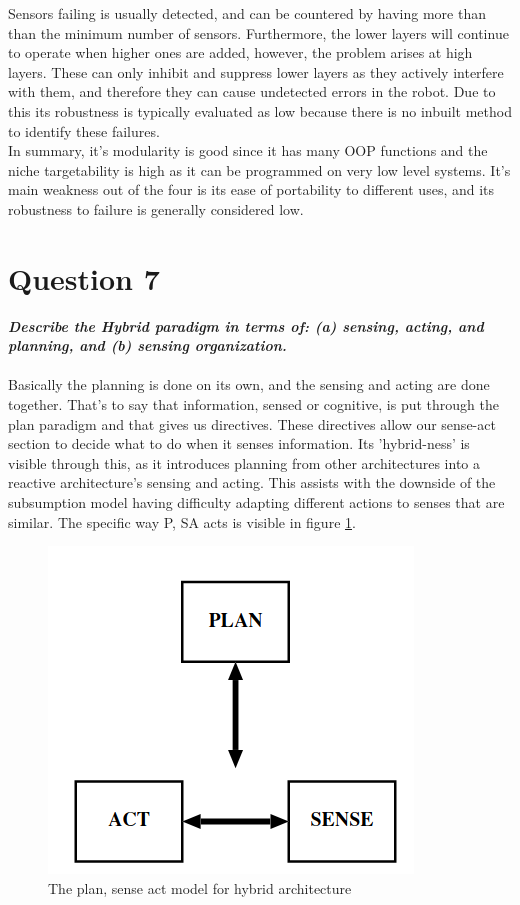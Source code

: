\documentclass{article}
\newcommand\tab[1][1cm]{\hspace*{#1}}
\begin{document}
Sensors failing is usually detected, and can be countered by having 
more than than the minimum number of sensors. 
Furthermore, the lower layers will continue to operate when higher ones
are added, however, the problem arises at high layers. 
These can only inhibit and suppress lower layers as they actively
interfere with them, and therefore they can cause undetected 
errors in the robot. Due to this its robustness is typically
evaluated as low because there is no inbuilt method to identify 
these failures. \cite{IntroToAI} \cite{reactiveParadigms}
\\
\tab In summary, it's modularity is good since it has many OOP functions and the niche targetability is high as it can be programmed
on very low level systems. 
It's main weakness out of the four is its ease of portability to different uses, and its robustness to failure
is generally considered low.

\newpage
\section*{Question 7}
\textbf{\textit{
    \tab Describe the Hybrid paradigm in terms of: (a) sensing, acting, and planning, and (b) sensing organization.
}} \\ \\

Basically the planning is done on its own, and the sensing and acting are done together. That's to say that information,
sensed or cognitive, is put through the plan paradigm and that gives us directives. These directives allow our sense-act
section to decide what to do when it senses information. Its 'hybrid-ness' is visible through this, as it introduces
planning from other architectures into a reactive architecture's sensing and acting.
This assists with the downside of the subsumption model having difficulty adapting different actions 
to senses that are similar. The specific way P, SA acts is visible in figure \ref{HybridPSA}.
\begin{figure}[ht]
    \centering
    \includegraphics[scale=0.5]{img/PSA-Hybrid.png}
    \caption{The plan, sense act model for hybrid architecture}
    \label{HybridPSA}
\end{figure}
\end{document}
